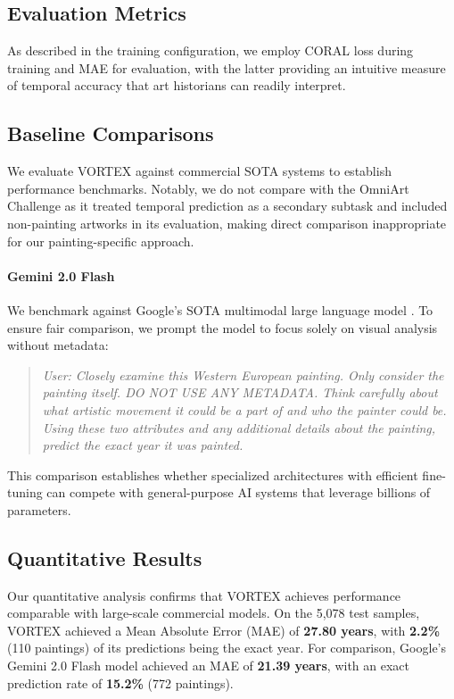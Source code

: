 \documentclass[10pt,twocolumn,letterpaper]{article}
\begin{document}
\subsection{Evaluation Metrics}

As described in the training configuration, we employ CORAL loss during training and MAE for evaluation, with the latter providing an intuitive measure of temporal accuracy that art historians can readily interpret.

\subsection{Baseline Comparisons}

We evaluate VORTEX against commercial SOTA systems to establish performance benchmarks. Notably, we do not compare with the OmniArt Challenge as it treated temporal prediction as a secondary subtask and included non-painting artworks in its evaluation, making direct comparison inappropriate for our painting-specific approach.

\paragraph{Gemini 2.0 Flash} We benchmark against Google's SOTA multimodal large language model \cite{GeminiTeam23}. To ensure fair comparison, we prompt the model to focus solely on visual analysis without metadata:
\begin{quote}
    \textit{User: Closely examine this Western European painting. Only consider the painting itself. DO NOT USE ANY METADATA. Think carefully about what artistic movement it could be a part of and who the painter could be. Using these two attributes and any additional details about the painting, predict the exact year it was painted.}
\end{quote}

This comparison establishes whether specialized architectures with efficient fine-tuning can compete with general-purpose AI systems that leverage billions of parameters.

\subsection{Quantitative Results}

Our quantitative analysis confirms that VORTEX achieves performance comparable with large-scale commercial models. On the 5,078 test samples, VORTEX achieved a Mean Absolute Error (MAE) of \textbf{27.80 years}, with \textbf{2.2\%} (110 paintings) of its predictions being the exact year. For comparison, Google's Gemini 2.0 Flash model achieved an MAE of \textbf{21.39 years}, with an exact prediction rate of \textbf{15.2\%} (772 paintings).
\end{document}
